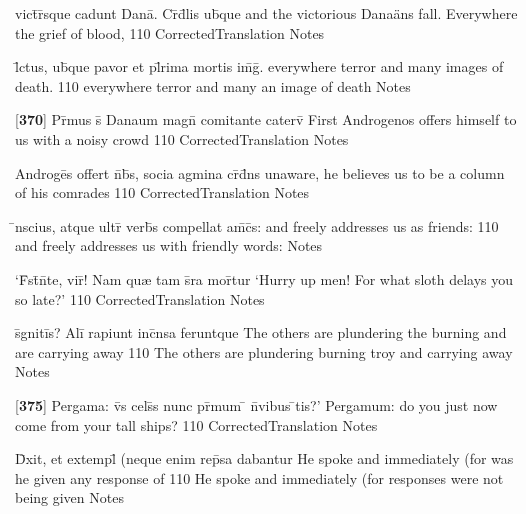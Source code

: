 \latline
  {vict\={}r\={}sque cadunt Dana\={\macron {\i}}.  Cr\={}d\={}lis ub\={\macron {\i}}que}
  { and the victorious Dana\"ans fall.  Everywhere the grief of blood,  }
  {110}
  { CorrectedTranslation }
  { Notes }


\latline
  {l\={}ctus, ub\={\macron {\i}}que pavor et pl\={}rima mortis im\={}g\={}.}
  { everywhere terror and many images of death. }
  {110}
  { everywhere terror and many an image of death }
  { Notes }


\latline
  {[\textbf{370}] Pr\={\macron {\i}}mus s\={} Danaum magn\={} comitante caterv\={}}
  { First Androgenos offers himself to us with a noisy crowd }
  {110}
  { CorrectedTranslation }
  { Notes }


\latline
  {Androge\={}s offert n\={}b\={\macron {\i}}s, socia agmina cr\={}d\={}ns}
  { unaware, he believes us to be a column of his comrades }
  {110}
  { CorrectedTranslation }
  { Notes }


\latline
  {\={\macron {\i}}nscius, atque ultr\={} verb\={\macron {\i}}s compellat am\={\macron {\i}}c\={\macron {\i}}s:}
  { and freely addresses us as friends: }
  {110}
  { and freely addresses us with friendly words: }
  { Notes }


\latline
  {`F\={}st\={\macron {\i}}n\={}te, vir\={\macron {\i}}!  Nam qu{\ae} tam s\={}ra mor\={}tur}
  { `Hurry up men!  For what sloth delays you so late?' }
  {110}
  { CorrectedTranslation }
  { Notes }


\latline
  {s\={}gniti\={}s?  Ali\={\macron {\i}} rapiunt inc\={}nsa feruntque}
  { The others are plundering the burning  and are carrying away }
  {110}
  { The others are plundering burning troy and carrying away }
  { Notes }


\latline
  {[\textbf{375}] Pergama:  v\={}s cels\={\macron {\i}}s nunc pr\={\macron {\i}}mum \={} n\={}vibus \={\macron {\i}}tis?'}
  { Pergamum: do you just now come from your tall ships?  }
  {110}
  { CorrectedTranslation }
  { Notes }


\latline
  {D\={\macron {\i}}xit, et extempl\={} (neque enim rep\={}sa dabantur}
  { He spoke and immediately (for was he given any response of  }
  {110}
  { He spoke and immediately (for responses were not being given  }
  { Notes }


